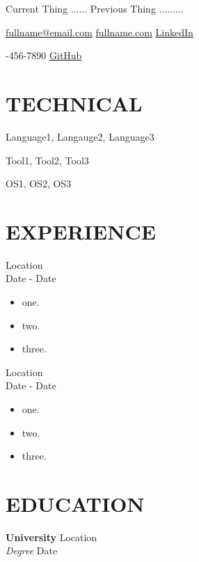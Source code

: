 \documentclass{article}
\begin{document}
\renewcommand\familydefault{\sfdefault}


\huge
{}
\normalsize
\hfill
Current Thing ...... Previous Thing .........

\noindent\hrulefill

\noindent 
\href{mailto:fullname@email.com}{fullname@email.com}
\hfill
\href{https://fullname.com}{fullname.com}
\hfill
\href{https://linkedin.com}{LinkedIn}

-456-7890
\hfill
\href{https://github.com}{GitHub}

\section*{TECHNICAL}

 \hspace{5.0em}
Language1, Langauge2, Language3

 \hspace{1.0em}
Tool1, Tool2, Tool3

 \hspace{0.5em}
OS1, OS2, OS3

\section*{EXPERIENCE}

 \hfill Location \\
 \hfill Date - Date
\begin{itemize}
\item one.
\item two.
\item three.
\end{itemize}

 \hfill Location \\
 \hfill Date - Date
\begin{itemize}
\item one.
\item two.
\item three.
\end{itemize}

\section*{EDUCATION}

{\bf University} \hfill Location \\
{\sl Degree} \hfill Date
\end{document}
